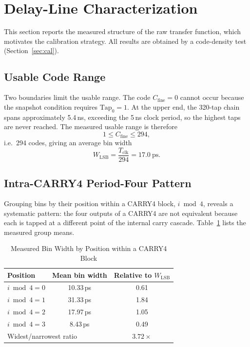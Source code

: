 \documentclass[journal]{IEEEtran}
\begin{document}
\section{Delay-Line Characterization}
\label{sec:char}

This section reports the measured structure of the raw transfer function,
which motivates the calibration strategy. All results are obtained by a
code-density test (Section~\ref{sec:cal}).

\subsection{Usable Code Range}

Two boundaries limit the usable range. The code $C_{\mathrm{fine}}=0$ cannot
occur because the snapshot condition requires $\mathrm{Tap}_0=1$. At the upper
end, the 320-tap chain spans approximately 5.4\,ns, exceeding the 5\,ns clock
period, so the highest taps are never reached. The measured usable range is
therefore
\begin{equation}
1 \le C_{\mathrm{fine}} \le 294 ,
\end{equation}
i.e.\ 294 codes, giving an average bin width
\begin{equation}
W_{\mathrm{LSB}} = \frac{T_{\mathrm{clk}}}{294} = 17.0~\mathrm{ps}.
\end{equation}

\subsection{Intra-CARRY4 Period-Four Pattern}

Grouping bins by their position within a CARRY4 block, $i \bmod 4$, reveals a
systematic pattern: the four outputs of a CARRY4 are not equivalent because
each is tapped at a different point of the internal carry cascade.
Table~\ref{tab:period4} lists the measured group means.

\begin{table}[htbp]
\caption{Measured Bin Width by Position within a CARRY4 Block}
\label{tab:period4}
\centering
\begin{tabular}{lcc}
\toprule
Position & Mean bin width & Relative to $W_{\mathrm{LSB}}$ \\
\midrule
$i \bmod 4 = 0$ & 10.33\,ps & 0.61 \\
$i \bmod 4 = 1$ & 31.33\,ps & 1.84 \\
$i \bmod 4 = 2$ & 17.97\,ps & 1.05 \\
$i \bmod 4 = 3$ & \phantom{0}8.43\,ps & 0.49 \\
\midrule
\multicolumn{2}{l}{Widest/narrowest ratio} & $3.72\times$ \\
\bottomrule
\end{tabular}
\end{table}
\end{document}
